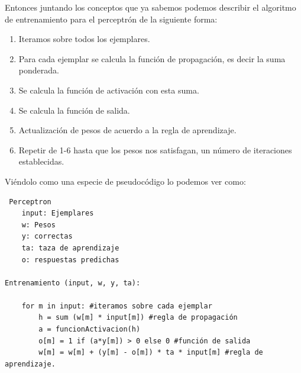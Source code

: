 Entonces juntando los conceptos que ya sabemos podemos describir el algoritmo de entrenamiento para el perceptrón de la siguiente forma:
\begin{enumerate}
 \item Iteramos sobre todos los ejemplares.
 \item Para cada ejemplar se calcula la función de propagación, es decir la suma ponderada.
 \item Se calcula la función de activación con esta suma.
 \item Se calcula la función de salida.
 \item Actualización de pesos de acuerdo a la regla de aprendizaje.
 \item Repetir de 1-6 hasta que los pesos nos satisfagan, un número de iteraciones establecidas.
\end{enumerate}


Viéndolo como una especie de pseudocódigo lo podemos ver como:

\begin{verbatim}
 Perceptron
	input: Ejemplares
	w: Pesos
	y: correctas	
	ta: taza de aprendizaje
	o: respuestas predichas
	
Entrenamiento (input, w, y, ta):

	for m in input: #iteramos sobre cada ejemplar
		h = sum (w[m] * input[m]) #regla de propagación 
		a = funcionActivacion(h) 
		o[m] = 1 if (a*y[m]) > 0 else 0 #función de salida
		w[m] = w[m] + (y[m] - o[m]) * ta * input[m] #regla de aprendizaje.

\end{verbatim}


